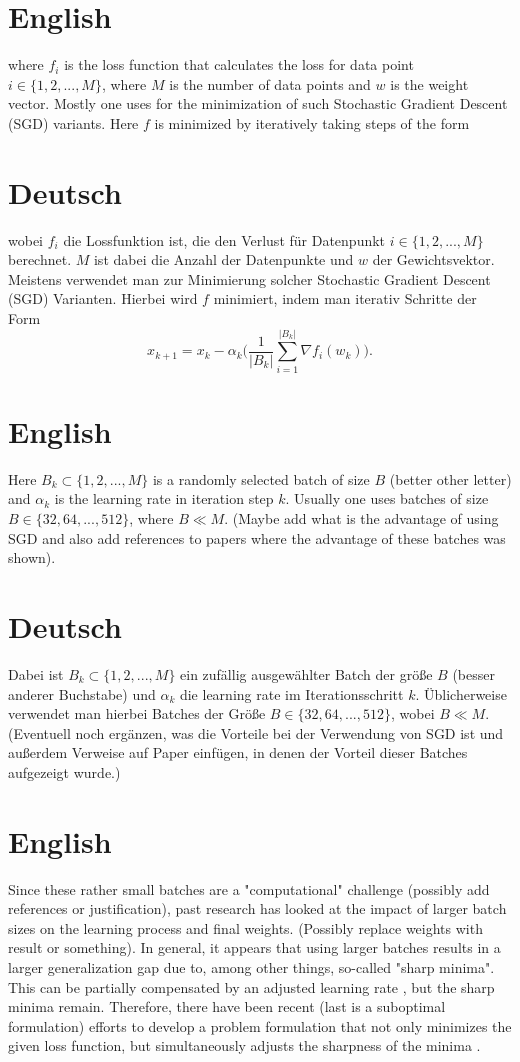 \documentclass[10pt,conference,compsocconf]{IEEEtran}
\begin{document}
\section*{English}
where $f_i$ is the loss function that calculates the loss for data point $i \in \{1, 2, ..., M\}$, where $M$ is the number of data points and $w$ is the weight vector. 
Mostly one uses for the minimization of such Stochastic Gradient Descent (SGD) variants. Here $f$ is minimized by iteratively taking steps of the form
\section*{Deutsch}
wobei $f_i$ die Lossfunktion ist, die den Verlust für Datenpunkt $i \in \{1, 2, ..., M\}$ berechnet. $M$ ist dabei die Anzahl der Datenpunkte und $w$ der Gewichtsvektor. 
Meistens verwendet man zur Minimierung solcher Stochastic Gradient Descent (SGD) Varianten. Hierbei wird $f$ minimiert, indem man iterativ Schritte der Form
\begin{equation}
x_{k+1} = x_k - \alpha_k \biggl(\frac{1}{|B_k|} \sum_{i = 1}^{|B_k|}{\nabla f_i(w_k) \biggl)}.
\end{equation}
\section*{English}
Here $B_k \subset \{1,2,..., M\}$ is a randomly selected batch of size $B$ (better other letter) and $\alpha_k$ is the learning rate in iteration step $k$. Usually one uses batches of size $B \in \{32, 64, ..., 512\}$, where $B \ll M$. (Maybe add what is the advantage of using SGD and also add references to papers where the advantage of these batches was shown).
\section*{Deutsch}
Dabei ist $B_k \subset \{1,2,..., M\}$ ein zufällig ausgewählter Batch der größe $B$ (besser anderer Buchstabe) und $\alpha_k$ die learning rate im Iterationsschritt $k$. Üblicherweise verwendet man hierbei Batches der Größe $B \in \{32, 64, ..., 512\}$, wobei $B \ll M$. (Eventuell noch ergänzen, was die Vorteile bei der Verwendung von SGD ist und außerdem Verweise auf Paper einfügen, in denen der Vorteil dieser Batches aufgezeigt wurde.)
\section*{English}
Since these rather small batches are a "computational" challenge (possibly add references or justification), past research has looked at the impact of larger batch sizes on the learning process and final weights. (Possibly replace weights with result or something). 
In general, it appears that using larger batches results in a larger generalization gap due to, among other things, so-called "sharp minima"\cite{keskar2017largebatch}. This can be partially compensated by an adjusted learning rate \cite{goyal2018accurate}, but the sharp minima remain. 
Therefore, there have been recent (last is a suboptimal formulation) efforts to develop a problem formulation that not only minimizes the given loss function, but simultaneously adjusts the sharpness of the minima \cite{foret2021sharpnessaware}. 
\end{document}
